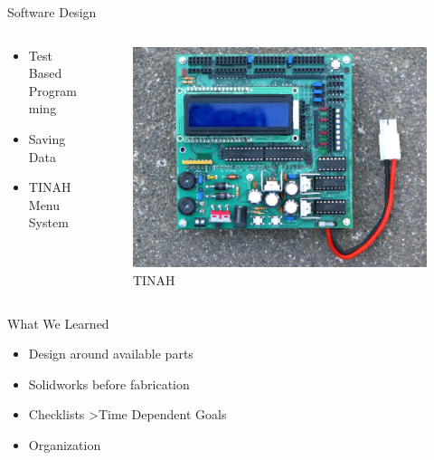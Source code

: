 \documentclass[aspectratio=43]{beamer}
\begin{document}
  \begin{frame}{Software Design}
    \begin{columns}[c]
      \begin{column}[c]{5cm}
        \begin{itemize}
          \item Test Based Programming
          \item Saving Data
          \item TINAH Menu System
        \end{itemize}
      \end{column}
      \begin{column}[c]{5cm}
        \begin{figure}[h]
          \centering
          \includegraphics[scale=0.5]{TINAH.jpg}
          \vspace{7pt}
          \large{TINAH}
        \end{figure}
      \end{column}
    \end{columns}
  \end{frame} 
  

  \begin{frame}{What We Learned}
    \begin{itemize}
      \item <2->Design around available parts 
      \item <3->Solidworks before fabrication
      \item <4->Checklists \textgreater Time Dependent Goals
      \item <5->Organization
    \end{itemize}
  \end{frame} 
  
\end{document}
